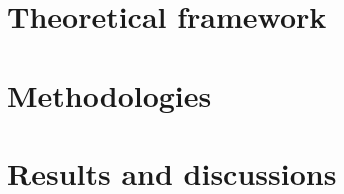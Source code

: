 \documentclass[11pt, a4paper, twoside, openright]{book}
\begin{document}


%
\maketitle

\frontmatter

\dominitoc 
\tableofcontents

\mainmatter


\part{Theoretical framework}





\part{Methodologies}



\part{Results and discussions}





\backmatter
\end{document}
